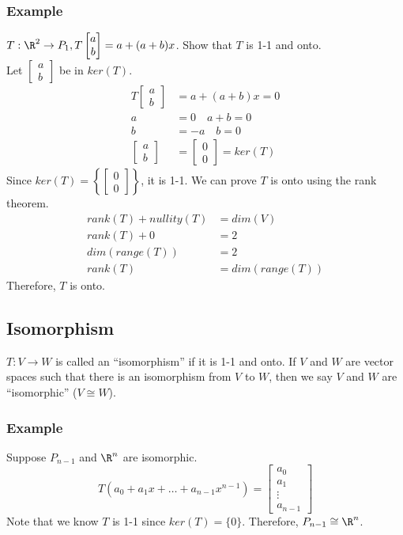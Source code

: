 \documentclass{math}
\begin{document}
\subsubsection*{Example}
\( T:\R^2\to P_1, T\begin{bmatrix}a \\ b\end{bmatrix} = a+(a+b)x \). Show that
\( T \) is 1-1 and onto. \\
Let \( \begin{bmatrix}a \\ b\end{bmatrix} \) be in \( ker(T) \).
\begin{align*}
  T\begin{bmatrix}a \\ b\end{bmatrix} &= a+(a+b)x = 0 \\
  a &= 0 \quad a+b = 0 \\
  b &= -a \quad b = 0 \\
  \begin{bmatrix}a \\ b\end{bmatrix} &= \begin{bmatrix}0 \\ 0\end{bmatrix} =
    ker(T)
\end{align*}
Since \( ker(T) = \left\{\begin{bmatrix}0 \\ 0\end{bmatrix}\right\} \), it is
1-1. We can prove \( T \) is onto using the rank theorem.
\begin{align*}
  rank(T)+nullity(T) &= dim(V) \\
  rank(T)+0 &= 2 \\
  dim(range(T)) &= 2 \\
  rank(T) &= dim(range(T))
\end{align*}
Therefore, \( T \) is onto.

\subsection*{Isomorphism}
\( T:V\to W \) is called an ``isomorphism'' if it is 1-1 and onto. If \( V \)
and \( W \) are vector spaces such that there is an isomorphism from \( V \) to
\( W \), then we say \( V \) and \( W \) are ``isomorphic'' (\( V\cong W \)).

\subsubsection*{Example}
Suppose \( P_{n-1} \) and \( \R^n \) are isomorphic.
\[ T(a_0+a_1x+\dots+a_{n-1}x^{n-1}) = \begin{bmatrix}a_0 \\ a_1 \\ \vdots \\
  a_{n-1}\end{bmatrix} \]
Note that we know \( T \) is 1-1 since \( ker(T) = \{0\} \). Therefore,
\( P_{n-1} \cong \R^n \).
\end{document}
